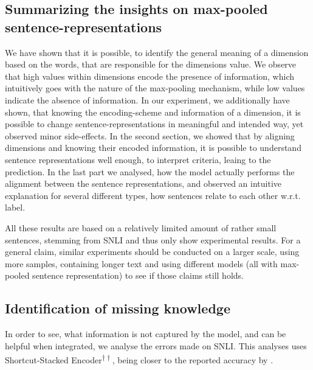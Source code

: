 \subsection{Summarizing the insights on max-pooled sentence-representations}
We have shown that it is possible, to identify the general meaning of a dimension based on the words, that are responsible for the dimensions value. We observe that high values within dimensions encode the presence of information, which intuitively goes with the nature of the max-pooling mechanism, while low values indicate the absence of information. In our experiment, we additionally have shown, that knowing the encoding-scheme and information of a dimension, it is possible to change sentence-representations in meaningful and intended way, yet observed minor side-effects. In the second section, we showed that by aligning dimensions and knowing their encoded information, it is possible to understand sentence representations well enough, to interpret criteria, leaing to the prediction. In the last part we analysed, how the model actually performs the alignment between the sentence representations, and observed an intuitive explanation for several different types, how sentences relate to each other w.r.t. label.
\newline

\noindent
All these results are based on a relatively limited amount of rather small sentences, stemming from \ac{SNLI} and thus only show experimental results. For a general claim, similar experiments should be conducted on a larger scale, using more samples, containing longer text and using different models (all with max-pooled sentence representation) to see if those claims still holds. 
\subsection{Identification of missing knowledge}
In order to see, what information is not captured by the model, and can be helpful when integrated, we analyse the errors made on \ac{SNLI}. This analyses uses Shortcut-Stacked Encoder\textsuperscript{$\dagger\dagger$}, being closer to the reported accuracy by \cite{nie2017shortcut}. 
